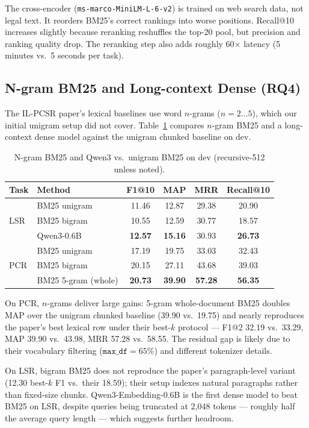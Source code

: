 \documentclass[11pt]{article}
\begin{document}
The cross-encoder (\texttt{ms-marco-MiniLM-L-6-v2}) is trained on web search data, not legal text. It reorders BM25's correct rankings into worse positions. Recall@10 increases slightly because reranking reshuffles the top-20 pool, but precision and ranking quality drop. The reranking step also adds roughly 60$\times$ latency (5 minutes vs.\ 5 seconds per task).

\subsection{N-gram BM25 and Long-context Dense (RQ4)}

The IL-PCSR paper's lexical baselines use word $n$-grams ($n=2\ldots5$), which our initial unigram setup did not cover. Table~\ref{tab:ngram} compares $n$-gram BM25 and a long-context dense model against the unigram chunked baseline on dev.

\begin{table}[h]
\centering
\caption{N-gram BM25 and Qwen3 vs.\ unigram BM25 on dev (recursive-512 unless noted).}
\label{tab:ngram}
\begin{tabular}{llcccc}
\toprule
Task & Method & F1@10 & MAP & MRR & Recall@10 \\
\midrule
\multirow{3}{*}{LSR} & BM25 unigram & 11.46 & 12.87 & 29.38 & 20.90 \\
 & BM25 bigram & 10.55 & 12.59 & 30.77 & 18.57 \\
 & Qwen3-0.6B & \textbf{12.57} & \textbf{15.16} & 30.93 & \textbf{26.73} \\
\midrule
\multirow{3}{*}{PCR} & BM25 unigram & 17.19 & 19.75 & 33.03 & 32.43 \\
 & BM25 bigram & 20.15 & 27.11 & 43.68 & 39.03 \\
 & BM25 5-gram (whole) & \textbf{20.73} & \textbf{39.90} & \textbf{57.28} & \textbf{56.35} \\
\bottomrule
\end{tabular}
\end{table}

On PCR, $n$-grams deliver large gains: 5-gram whole-document BM25 doubles MAP over the unigram chunked baseline (39.90 vs.\ 19.75) and nearly reproduces the paper's best lexical row under their best-$k$ protocol --- F1@2 32.19 vs.\ 33.29, MAP 39.90 vs.\ 43.98, MRR 57.28 vs.\ 58.55. The residual gap is likely due to their vocabulary filtering ($\texttt{max\_df}=65\%$) and different tokenizer details.

On LSR, bigram BM25 does not reproduce the paper's paragraph-level variant (12.30 best-$k$ F1 vs.\ their 18.59); their setup indexes natural paragraphs rather than fixed-size chunks. Qwen3-Embedding-0.6B is the first dense model to beat BM25 on LSR, despite queries being truncated at 2{,}048 tokens --- roughly half the average query length --- which suggests further headroom.
\end{document}
